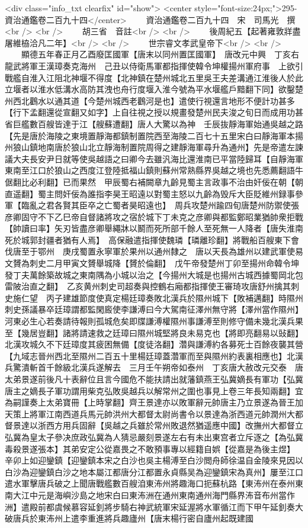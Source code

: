 <div class="info_txt clearfix" id="show">
<center style="font-size:24px;">295-資治通鑑卷二百九十四</center>
  　　資治通鑑卷二百九十四　宋　司馬光　撰<br />
<br />
　　胡三省　音註<br />
<br />
　　後周紀五【起著雍敦牂盡屠維栛洽凡二年】<br />
<br />
　　世宗睿文孝武皇帝下<br />
<br />
　　顯德五年春正月乙酉廢匡國軍【唐末以同州置匡國軍】　唐改元中興　丁亥右龍武將軍王漢璋奏克海州　己丑以侍衛馬軍都指揮使韓令坤權揚州軍府事　上欲引戰艦自淮入江阻北神堰不得度【北神鎮在楚州城北五里吳王夫差溝通江淮後人於此立堰者以淮水低溝水高防其洩也舟行度堰入淮今號為平水堰艦戶黯翻下同】欲鑿楚州西北鸛水以通其道【今楚州城西老鸛河是也】遣使行視還言地形不便計功甚多【行下孟翻還從宣翻又如字】上自往視之授以規畫發楚州民夫浚之旬日而成用功甚省巨艦數百艘皆達于江【艘蘇遭翻】唐人大驚以為神　壬辰抜靜海軍始通吳越之路【先是唐於海陵之東境置靜海都鎮制置院西至海陵二百七十五里宋白曰靜海軍本揚州狼山鎮地南唐於狼山北立靜海制置院周得之建靜海軍尋升為通州】先是帝遣左諫議大夫長安尹日就等使吳越語之曰卿今去雖汎海比還淮南已平當陸歸耳【自靜海軍東南至江口於狼山之西度江登陸抵福山鎮則蘇州常熟縣界吳越之境也先悉薦翻語牛倨翻比必利翻】已而果然　甲辰蜀右補闕章九齡見蜀主言政事不治由奸佞在朝【朝直遥翻】蜀主問奸佞為誰指李昊王昭遠以對蜀主怒以九齡為毁斥大臣貶維州録事參軍【臨亂之君各賢其臣卒之亡蜀者昊昭遠也】　周兵攻楚州踰四旬唐楚州防禦使張彦卿固守不下乙巳帝自督諸將攻之宿於城下丁未克之彦卿與都監鄭昭業猶帥衆拒戰【帥讀曰率】矢刃皆盡彦卿舉繩牀以鬭而死所部千餘人至死無一人降者【唐失淮南死於城郭封疆者猶有人焉】　高保融遣指揮使魏璘【璘離珍翻】將戰船百艘東下會伐唐至于鄂州　庚戌蜀置永寧軍於果州以通州隸之　唐以天長為雄州以建武軍使易文贇為刺史二月甲寅文贇舉城降【贇於倫翻】　戊午帝發楚州丁卯至揚州命韓令坤發丁夫萬餘築故城之東南隅為小城以治之【今揚州大城是也揚州古城西據蜀岡北包雷陂治直之翻】　乙亥黄州刺史司超奏與控鶴右廂都指揮使王審琦攻唐舒州擒其刺史施仁望　丙子建雄節度使真定楊廷璋奏敗北漢兵於隰州城下【敗補邁翻】時隰州刺史孫議暴卒廷璋謂都監閑廄使李謙溥曰今大駕南征澤州無守將【澤州當作隰州】河東必生心若奏請待報則孤城危矣即牒謙溥權隰州事謙溥至則修守備未幾北漢兵果至【幾居豈翻】諸將請速救之廷璋曰隰州城堅將良未易克也【將即亮翻易以䜴翻】北漢攻城久不下廷璋度其疲困無備【度徒洛翻】濳與謙溥約各募死士百餘夜襲其營【九域志晉州西北至隰州二百五十里楊廷璋蓋濳軍而至與隰州約表裏相應也】北漢兵驚潰斬首千餘級北漢兵遂解去　三月壬午朔帝如泰州　丁亥唐大赦改元交泰　唐太弟景遂前後凡十表辭位且言今國危不能扶請出就藩鎮燕王弘冀嫡長有軍功【弘冀唐主之嫡長子軍功謂用柴克弘敗吳越兵以解常州之圍也事見上卷三年長知兩翻】宜為嗣謹奏上太弟寶冊【上時掌翻】齊王景達亦以敗軍辭元帥唐主乃立景遂為晉王加天策上將軍江南西道兵馬元帥洪州大都督太尉尚書令以景達為浙西道元帥潤州大都督景達以浙西方用兵固辭【吳越之兵雖於常州敗退然猶遥應中國】改撫州大都督立弘冀為皇太子參决庶政弘冀為人猜忌嚴刻景遂左右有未出東宫者立斥逐之【為弘冀毒殺景遂張本】其弟安定公從嘉畏之不敢預事專以經籍自娯【從嘉是為後主煜】　辛卯上如迎鑾鎮【迎鑾鎮本宋之白沙也吳主楊溥至白沙閲舟師徐温自金陵來見因以白沙為迎鑾鎮白沙之地本屬江都唐分江都置永貞縣吴為迎鑾鎮宋為真州】屢至江口遣水軍擊唐兵破之上聞唐戰艦數百艘洎東㳍州將趣海口扼蘇杭路【東㳍州在泰州東南大江中元是海嶼沙島之地宋白曰東㳍洲在通州東南通州海門縣界㳍音布州當作洲】遣殿前都虞候慕容延釗將步騎右神武統軍宋延渥將水軍循江而下甲午延釗奏大破唐兵於東㳍州上遣李重進將兵趣廬州【唐末楊行密自廬州起既建國